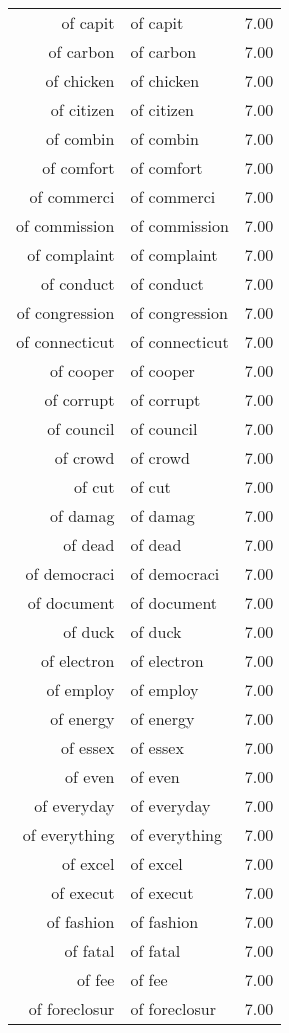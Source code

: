 \begin{table}[ht]
\begin{tabular}{rlr}
  of capit & of capit & 7.00 \\ 
  of carbon & of carbon & 7.00 \\ 
  of chicken & of chicken & 7.00 \\ 
  of citizen & of citizen & 7.00 \\ 
  of combin & of combin & 7.00 \\ 
  of comfort & of comfort & 7.00 \\ 
  of commerci & of commerci & 7.00 \\ 
  of commission & of commission & 7.00 \\ 
  of complaint & of complaint & 7.00 \\ 
  of conduct & of conduct & 7.00 \\ 
  of congression & of congression & 7.00 \\ 
  of connecticut & of connecticut & 7.00 \\ 
  of cooper & of cooper & 7.00 \\ 
  of corrupt & of corrupt & 7.00 \\ 
  of council & of council & 7.00 \\ 
  of crowd & of crowd & 7.00 \\ 
  of cut & of cut & 7.00 \\ 
  of damag & of damag & 7.00 \\ 
  of dead & of dead & 7.00 \\ 
  of democraci & of democraci & 7.00 \\ 
  of document & of document & 7.00 \\ 
  of duck & of duck & 7.00 \\ 
  of electron & of electron & 7.00 \\ 
  of employ & of employ & 7.00 \\ 
  of energy & of energy & 7.00 \\ 
  of essex & of essex & 7.00 \\ 
  of even & of even & 7.00 \\ 
  of everyday & of everyday & 7.00 \\ 
  of everything & of everything & 7.00 \\ 
  of excel & of excel & 7.00 \\ 
  of execut & of execut & 7.00 \\ 
  of fashion & of fashion & 7.00 \\ 
  of fatal & of fatal & 7.00 \\ 
  of fee & of fee & 7.00 \\ 
  of foreclosur & of foreclosur & 7.00 \\ 

\end{tabular}
\end{table}
